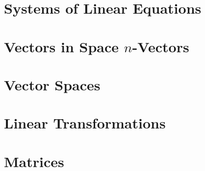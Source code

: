 \documentclass[12pt]{book}
\newcommand{\1}{{\mathrm 1\hspace*{-0.4ex}%
\rule{0.1ex}{1.52ex}\hspace*{0.2ex}}}
\begin{document}
%
%
%
%
%
%
%
%
%

%
\section{Systems of Linear Equations}


%

%

%
%
%
%
%




%


%

%

%
\section{Vectors in Space $n$-Vectors}
%
%
%
%
%

%

%
\section{Vector Spaces}

%

%

%
\section{Linear Transformations}
%
%
%
%

%
\section{Matrices}

%

%
%
%
%
%

%

%
%

%


%

%

%

%

%

%

%
\end{document}
